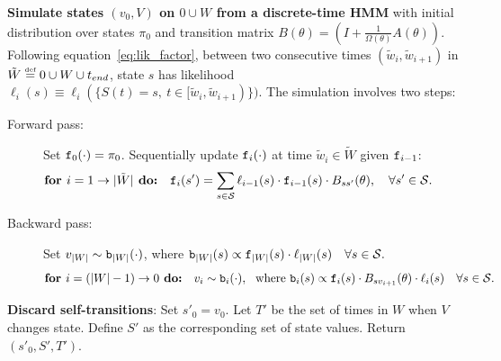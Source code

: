 \begin{algorithm}[H]
\begin{algorithmic}[1]
  \State \textbf{ Simulate states $(v_0,V)$ on $0 \cup W$ from a discrete-time HMM} 
  with initial distribution over states $\pi_0$ and transition matrix $B(\theta) = \left(I+\frac{1}{\Omega(\theta)}A(\theta)\right)$.
Following equation~\eqref{eq:lik_factor}, between two consecutive times $(\tilde{w}_i,\tilde{w}_{i+1})$ in $\tilde{W} \defeq 0 \cup W \cup t_{end}$, state $s$ has 
likelihood $\ell_i(s) \equiv \ell_i(\{S(t) = s,\ t \in [\tilde{w}_i,\tilde{w}_{i+1})\})$. The simulation involves two steps: 
\begin{description}
  \item[Forward pass:] 
    Set $\mathtt{f}_0(\cdot) = \pi_0$.
    Sequentially update $\mathtt{f}_i(\cdot)$ at time $\tilde{w}_i \in \tilde{W}$ given $\mathtt{f}_{i-1}$: 
        \vspace{-.1in}
        $$\textbf{for } i=1\rightarrow |\tilde{W}|\textbf{ do:} \quad \mathtt{f}_i(s') = \sum_{s \in {\mathcal S}} \ell_{i-1}(s) \cdot \mathtt{f}_{i-1}(s)\cdot B_{ss'}(\theta), \quad \forall s' \in {\mathcal S}.\qquad\qquad\quad $$
  \item[Backward pass:]
    Set ${v}_{|{W}|} \sim \mathtt{b}_{|{W}|}(\cdot)$, where $\mathtt{b}_{|{W}|}(s) \propto \mathtt{f}_{|{W}|}(s)\cdot\ell_{|{W}|}(s) \quad \forall s \in {\mathcal S}.$ 
    $$ \textbf{for } i=(|{W}|-1)\rightarrow 0\textbf{ do:} \quad {v}_i \sim \mathtt{b}_i(\cdot),\ \  \text{where } 
    \mathtt{b}_i(s) \propto \mathtt{f}_i(s)\cdot B_{sv_{i+1}}(\theta) \cdot \ell_i(s)  \quad \forall s \in {\mathcal S}.$$
\end{description}
        \vspace{-.1in}
\State \textbf{Discard self-transitions}: Set $s'_0 = v_0$. Let $T'$ be the set of times in ${W}$ when $V$ changes state. Define $S'$ as the corresponding set of state values. Return $(s'_0, S', T')$.
\end{algorithmic}
\end{algorithm}

